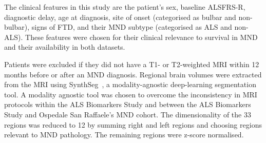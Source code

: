 The clinical features in this study are the patient's sex, baseline ALSFRS-R, diagnostic delay, age at diagnosis, site of onset (categorised as bulbar and non-bulbar), signs of FTD, and their MND subtype (categorised as ALS and non-ALS).
These features were chosen for their clinical relevance to survival in MND and their availability in both datasets.

Patients were excluded if they did not have a T1- or T2-weighted MRI within 12 months before or after an MND diagnosis.
Regional brain volumes were extracted from the MRI using SynthSeg~\cite{billotSynthSegDomainRandomisation2021}, a modality-agnostic deep-learning segmentation tool.
A modality agnostic tool was chosen to overcome the inconsistency in MRI protocols within the ALS Biomarkers Study and between the ALS Biomarkers Study and Ospedale San Raffaele's MND cohort.
The dimensionality of the 33 regions was reduced to 12 by summing right and left regions and choosing regions relevant to MND pathology.
The remaining regions were z-score normalised.

